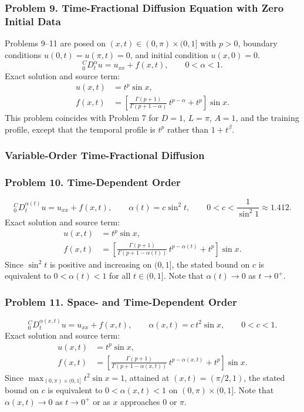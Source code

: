 \documentclass[11pt]{article}
\newcommand{\Caputo}[1]{{}^{C}_{0}D_t^{#1}}
\begin{document}
\subsubsection*{Problem 9. Time-Fractional Diffusion Equation with Zero Initial Data}

Problems 9--11 are posed on $(x,t)\in(0,\pi)\times(0,1]$ with $p>0$,
boundary conditions $u(0,t)=u(\pi,t)=0$, and initial condition
$u(x,0)=0$.
\[
\boxed{\Caputo{\alpha}u=u_{xx}+f(x,t)},
\qquad 0<\alpha<1.
\]
Exact solution and source term:
\[
\begin{aligned}
u(x,t)&=t^p\sin x,\\
f(x,t)&=
\left[
\frac{\Gamma(p+1)}{\Gamma(p+1-\alpha)}\,
t^{p-\alpha}+t^p
\right]\sin x.
\end{aligned}
\]
This problem coincides with Problem 7 for $D=1$, $L=\pi$, $A=1$, and the
training profile, except that the temporal profile is $t^p$ rather than
$1+t^\beta$.

\subsubsection*{Variable-Order Time-Fractional Diffusion}

\subsubsection*{Problem 10. Time-Dependent Order}

\[
\boxed{\Caputo{\alpha(t)}u=u_{xx}+f(x,t)},
\qquad \alpha(t)=c\sin^2 t,
\qquad 0<c<\frac{1}{\sin^2 1}\approx1.412.
\]
Exact solution and source term:
\[
\begin{aligned}
u(x,t)&=t^p\sin x,\\
f(x,t)&=
\left[
\frac{\Gamma(p+1)}{\Gamma(p+1-\alpha(t))}\,
t^{p-\alpha(t)}+t^p
\right]\sin x.
\end{aligned}
\]
Since $\sin^2 t$ is positive and increasing on $(0,1]$, the stated bound
on $c$ is equivalent to $0<\alpha(t)<1$ for all $t\in(0,1]$. Note that
$\alpha(t)\to0$ as $t\to0^+$.

\subsubsection*{Problem 11. Space- and Time-Dependent Order}

\[
\boxed{\Caputo{\alpha(x,t)}u=u_{xx}+f(x,t)},
\qquad \alpha(x,t)=c\,t^2\sin x,
\qquad 0<c<1.
\]
Exact solution and source term:
\[
\begin{aligned}
u(x,t)&=t^p\sin x,\\
f(x,t)&=
\left[
\frac{\Gamma(p+1)}{\Gamma(p+1-\alpha(x,t))}\,
t^{p-\alpha(x,t)}+t^p
\right]\sin x.
\end{aligned}
\]
Since $\max_{(0,\pi)\times(0,1]}t^2\sin x=1$, attained at
$(x,t)=(\pi/2,1)$, the stated bound on $c$ is equivalent to
$0<\alpha(x,t)<1$ on $(0,\pi)\times(0,1]$. Note that $\alpha(x,t)\to0$
as $t\to0^+$ or as $x$ approaches $0$ or $\pi$.
\end{document}
